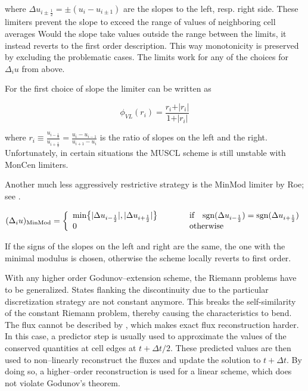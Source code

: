 where $\Delta u_{i\pm\frac{1}{2}} = \pm(u_{i} - u_{i\pm1})$ are the slopes to the left, resp. right side.
These limiters prevent the slope to exceed the range of values of neighboring cell averages
Would the slope take values outside the range between the limits, it instead reverts to the first order description.
This way monotonicity is preserved by excluding the problematic cases.
The limits work for any of the choices for $\Delta_{i} u$ from above.

For the first choice of slope the limiter can be written as

\begin{equation}
  \phi_{VL}(r_{i}) = \frac{r_{i} + \vert r_{i}\vert}{1 + \vert r_{i}\vert}
\end{equation}

where $r_{i} \equiv \frac{u_{i-\frac{1}{2}}}{u_{i+\frac{1}{2}}} = \frac{u_{i} - u_{i-1}}{u_{i+1} - u_{i}}$ is the ratio of slopes on the left and the right.
Unfortunately, in certain situations the MUSCL scheme is still unstable with MonCen limiters.

Another much less aggressively restrictive strategy is the MinMod limiter by Roe; see \citet{Sweby}.

\begin{equation}
  (\Delta_{i} u)_{\text{MinMod}} = \left\{\begin{array}{l l}
                                   \text{min}\big\{ \vert\Delta u_{i-\frac{1}{2}}\vert, \vert\Delta u_{i+\frac{1}{2}}\vert \big\} \hspace{1cm} & \text{if} \quad \text{sgn}(\Delta u_{i-\frac{1}{2}}) = \text{sgn}(\Delta u_{i+\frac{1}{2}}) \\
                                   0 \hspace{1cm} &\text{otherwise}
                                   \end{array}\right.
\end{equation}

If the signs of the slopes on the left and right are the same, the one with the minimal modulus is chosen, otherwise the scheme locally reverts to first order.

With any higher order Godunov--extension scheme, the Riemann problems have to be generalized.
States flanking the discontinuity due to the particular discretization strategy are not constant anymore.
This breaks the self-similarity of the constant Riemann problem, thereby causing the characteristics to bend.
The flux cannot be described by , which makes exact flux reconstruction harder.
In this case, a predictor step is usually used to approximate the values of the conserved quantities at cell edges at $t+\Delta t/2$.
These predicted values are then used to non--linearly reconstruct the fluxes and update the solution to $t+\Delta t$.
By doing so, a higher--order reconstruction is used for a linear scheme, which does not violate Godunov's theorem.

